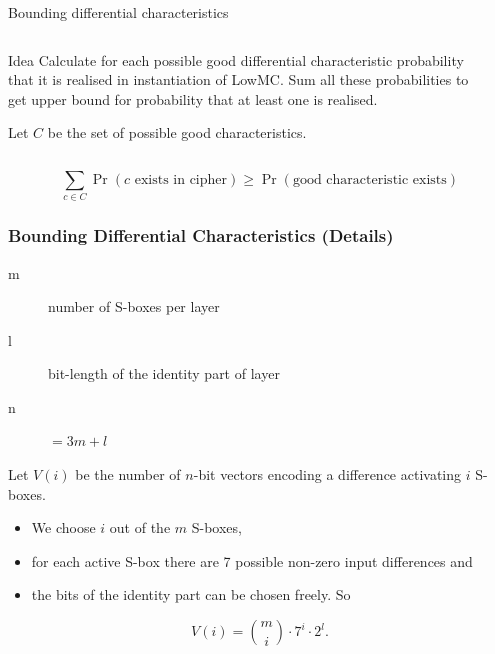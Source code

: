 \documentclass[10pt,compress]{beamer}
\begin{document}
\begin{frame}{Bounding differential characteristics}
\begin{columns}
\begin{column}{0.72\textwidth}
\begin{alertblock}{Idea}
  Calculate for each possible good differential characteristic probability that it is realised in instantiation of LowMC\@. Sum all these probabilities to get upper bound for probability that at least one is realised.
\end{alertblock}
Let $C$ be the set of possible good characteristics.
\end{column}
\begin{column}{0.28\textwidth}
  {
  \centering
  
  }
\end{column}
\end{columns}
\[\sum\limits_{c\in C} \Pr(c\text{ exists in cipher}) \geq \Pr(\text{good characteristic exists})\]
\end{frame}

\begin{frame}
  \frametitle{Bounding Differential Characteristics (Details)}

  \begin{description}
  \item[m] number of S-boxes per layer
  \item[l] bit-length of the identity part of layer
  \item[n] $=3m+l$
  \end{description}

  Let $V(i)$ be the number of $n$-bit vectors encoding a difference activating $i$ S-boxes. 

  \begin{itemize}
  \item We choose $i$ out of the $m$ S-boxes, 
  \item for each active S-box there are 7 possible non-zero input differences and
  \item the bits of the identity part can be chosen freely. So
  \end{itemize}

\[V(i) = \binom{m}{i} \cdot 7^i \cdot 2^l.\]
\end{frame}
\end{document}
